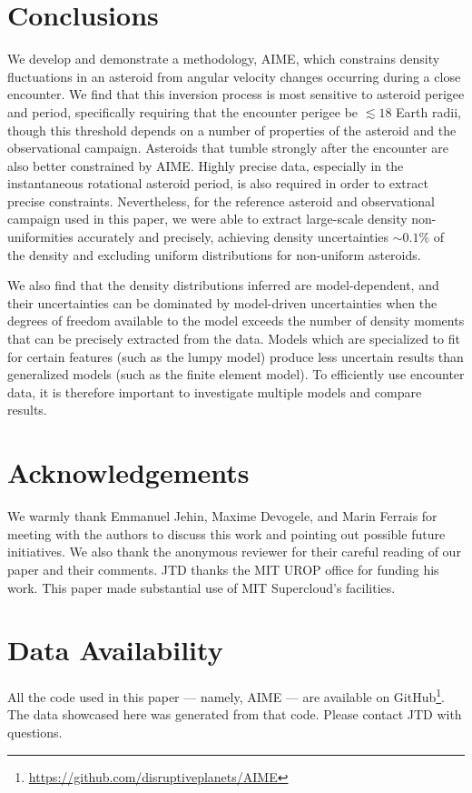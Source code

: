 \documentclass[fleqn,usenatbib]{mnras}
\begin{document}
\section{Conclusions}

We develop and demonstrate a methodology, AIME, which constrains density fluctuations in an asteroid from angular velocity changes occurring during a close encounter. We find that this inversion process is most sensitive to asteroid perigee and period, specifically requiring that the encounter perigee be $\lesssim 18$ Earth radii, though this threshold depends on a number of properties of the asteroid and the observational campaign. Asteroids that tumble strongly after the encounter are also better constrained by AIME. Highly precise data, especially in the instantaneous rotational asteroid period, is also required in order to extract precise constraints.  Nevertheless, for the reference asteroid and observational campaign used in this paper, we were able to extract large-scale density non-uniformities accurately and precisely, achieving density uncertainties $\sim 0.1\%$ of the density and excluding uniform distributions for non-uniform asteroids.

We also find that the density distributions inferred are model-dependent, and their uncertainties can be dominated by model-driven uncertainties when the degrees of freedom available to the model exceeds the number of density moments that can be precisely extracted from the data. Models which are specialized to fit for certain features (such as the lumpy model) produce less uncertain results than generalized models (such as the finite element model). To efficiently use encounter data, it is therefore important to investigate multiple models and compare results.



\section*{Acknowledgements}

We warmly thank Emmanuel Jehin, Maxime Devogele, and Marin Ferrais for meeting with the authors to discuss this work and pointing out possible future initiatives. We also thank the anonymous reviewer for their careful reading of our paper and their comments. JTD thanks the MIT UROP office for funding his work. This paper made substantial use of MIT Supercloud's facilities.


\section*{Data Availability}

All the code used in this paper --- namely, AIME --- are available on GitHub\footnote{\url{https://github.com/disruptiveplanets/AIME}}. The data showcased here was generated from that code. Please contact JTD with questions.







\bsp
\label{lastpage}
\end{document}
